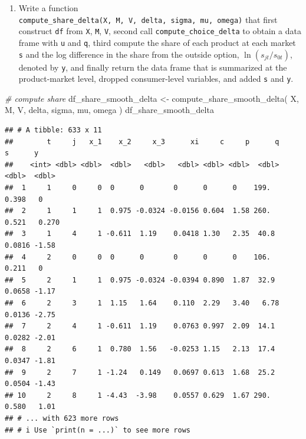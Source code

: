 \documentclass[
]{book}
\newenvironment{Shaded}{\begin{snugshade}}{\end{snugshade}}
\newcommand{\CommentTok}[1]{\textcolor[rgb]{0.56,0.35,0.01}{\textit{#1}}}
\newcommand{\FunctionTok}[1]{\textcolor[rgb]{0.00,0.00,0.00}{#1}}
\newcommand{\NormalTok}[1]{#1}
\newcommand{\OtherTok}[1]{\textcolor[rgb]{0.56,0.35,0.01}{#1}}
\providecommand{\tightlist}{%
  \setlength{\itemsep}{0pt}\setlength{\parskip}{0pt}}
\begin{document}
\begin{enumerate}
\def\labelenumi{\arabic{enumi}.}
\setcounter{enumi}{6}
\tightlist
\item
  Write a function \texttt{compute\_share\_delta(X,\ M,\ V,\ delta,\ sigma,\ mu,\ omega)} that first construct \texttt{df} from \texttt{X}, \texttt{M}, \texttt{V}, second call \texttt{compute\_choice\_delta} to obtain a data frame with \texttt{u} and \texttt{q}, third compute the share of each product at each market \texttt{s} and the log difference in the share from the outside option, \(\ln(s_{jt}/s_{0t})\), denoted by \texttt{y}, and finally return the data frame that is summarized at the product-market level, dropped consumer-level variables, and added \texttt{s} and \texttt{y}.
\end{enumerate}

\begin{Shaded}
\begin{Highlighting}[]
\CommentTok{\# compute share}
\NormalTok{df\_share\_smooth\_delta }\OtherTok{\textless{}{-}}
  \FunctionTok{compute\_share\_smooth\_delta}\NormalTok{(}
\NormalTok{    X, }
\NormalTok{    M, }
\NormalTok{    V, }
\NormalTok{    delta, }
\NormalTok{    sigma, }
\NormalTok{    mu, }
\NormalTok{    omega}
\NormalTok{    ) }
\NormalTok{df\_share\_smooth\_delta}
\end{Highlighting}
\end{Shaded}

\begin{verbatim}
## # A tibble: 633 x 11
##        t     j   x_1    x_2     x_3      xi     c     p      q      s      y
##    <int> <dbl> <dbl>  <dbl>   <dbl>   <dbl> <dbl> <dbl>  <dbl>  <dbl>  <dbl>
##  1     1     0     0  0      0       0      0      0    199.   0.398   0    
##  2     1     1     1  0.975 -0.0324 -0.0156 0.604  1.58 260.   0.521   0.270
##  3     1     4     1 -0.611  1.19    0.0418 1.30   2.35  40.8  0.0816 -1.58 
##  4     2     0     0  0      0       0      0      0    106.   0.211   0    
##  5     2     1     1  0.975 -0.0324 -0.0394 0.890  1.87  32.9  0.0658 -1.17 
##  6     2     3     1  1.15   1.64    0.110  2.29   3.40   6.78 0.0136 -2.75 
##  7     2     4     1 -0.611  1.19    0.0763 0.997  2.09  14.1  0.0282 -2.01 
##  8     2     6     1  0.780  1.56   -0.0253 1.15   2.13  17.4  0.0347 -1.81 
##  9     2     7     1 -1.24   0.149   0.0697 0.613  1.68  25.2  0.0504 -1.43 
## 10     2     8     1 -4.43  -3.98    0.0557 0.629  1.67 290.   0.580   1.01 
## # ... with 623 more rows
## # i Use `print(n = ...)` to see more rows
\end{verbatim}
\end{document}
